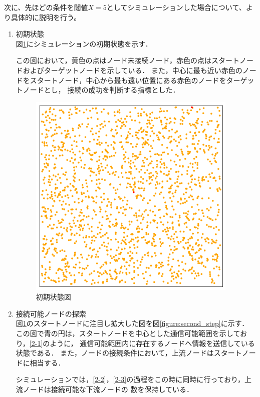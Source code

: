 \documentclass[a4paper, 11pt]{ltjsarticle}
\begin{document}
次に、先ほどの条件を閾値$X = 5$としてシミュレーションした場合について、より具体的に説明を行う。
\begin{enumerate}[label=\textbf{(\arabic*)}]
  \item 初期状態 \\
        図\ref{figure:first_step}にシミュレーションの初期状態を示す．

        この図において，黄色の点はノード未接続ノード，赤色の点はスタートノードおよびターゲットノードを示している．
        また，中心に最も近い赤色のノードをスタートノード，中心から最も遠い位置にある赤色のノードをターゲットノードとし，
        接続の成功を判断する指標とした．
        
        \begin{figure}[h]
          \centering
          \includegraphics[width=100mm]{1_step.png}
          \caption{初期状態図}
          \label{figure:first_step}
        \end{figure}
  \clearpage
  \item 接続可能ノードの探索 \label{探索} \\
        図\ref{figure:first_step}のスタートノードに注目し拡大した図を図\ref{figure:second_step}に示す．
        この図で青の円は，スタートノードを中心とした通信可能範囲を示しており，\ref{2-1}のように，
        通信可能範囲内に存在するノードへ情報を送信している状態である．
        また，ノードの接続条件において，上流ノードはスタートノードに相当する．
        
        \indent シミュレーションでは，\ref{2-2}，\ref{2-3}の過程をこの時に同時に行っており，上流ノードは接続可能な下流ノードの
        数を保持している．


\end{enumerate}
\end{document}
